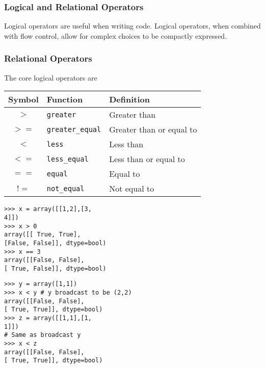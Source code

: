 \documentclass[KSmainSlides.tex]{subfiles}
\begin{document}
 

\begin{frame}
\frametitle{Logical and Relational Operators}
Logical operators are useful when writing code. Logical operators, when combined
with flow control, allow for complex choices to be compactly expressed.

\end{frame}
\begin{frame}
\frametitle{Relational Operators}
\Large

The core logical operators are
\begin{center}
\begin{tabular}{|c|l|l|} \hline
Symbol & Function & Definition \\ \hline
$> $     &   \texttt{greater}   & Greater than \\ \hline
$>=$    &  \texttt{greater\_equal} & Greater than or equal to \\ \hline
$< $      &  \texttt{less} & Less than \\ \hline
$<=$    &  \texttt{less\_equal} & Less than or equal to \\ \hline
$==$    &  \texttt{equal} & Equal to \\ \hline
$!=$      & \texttt{not\_equal} & Not equal to \\ \hline
\end{tabular} 
\end{center}
\end{frame}
\begin{frame}[fragile]
\begin{framed}
\begin{verbatim}
>>> x = array([[1,2],[3,
4]])
>>> x > 0
array([[ True, True],
[False, False]], dtype=bool)
>>> x == 3
array([[False, False],
[ True, False]], dtype=bool)
\end{verbatim}
\end{framed}
\end{frame}
\begin{frame}[fragile]
\begin{framed}
\begin{verbatim}
>>> y = array([1,1])
>>> x < y # y broadcast to be (2,2)
array([[False, False],
[ True, True]], dtype=bool)
>>> z = array([[1,1],[1,
1]])
# Same as broadcast y
>>> x < z
array([[False, False],
[ True, True]], dtype=bool)
\end{verbatim}
\end{framed}
\end{frame}
\end{document}
